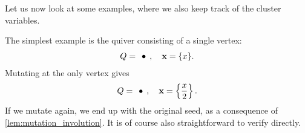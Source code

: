 Let us now look at some examples, where we also keep track of the cluster variables.
\begin{example}
	The simplest example is the quiver consisting of a single vertex:
	\begin{equation*}
		Q = \begin{tikzcd}
			\bullet
		\end{tikzcd},
		\quad \bx = \{x\}.
	\end{equation*}
	Mutating at the only vertex gives
	\begin{equation*}
		Q = \begin{tikzcd}
			\bullet
		\end{tikzcd},
		\quad \bx = \left\{\frac{x}{2}\right\}.
	\end{equation*}
	If we mutate again, we end up with the original seed, as a consequence of
	\cref{lem:mutation_involution}. It is of course also straightforward to verify
	directly.
\end{example}
